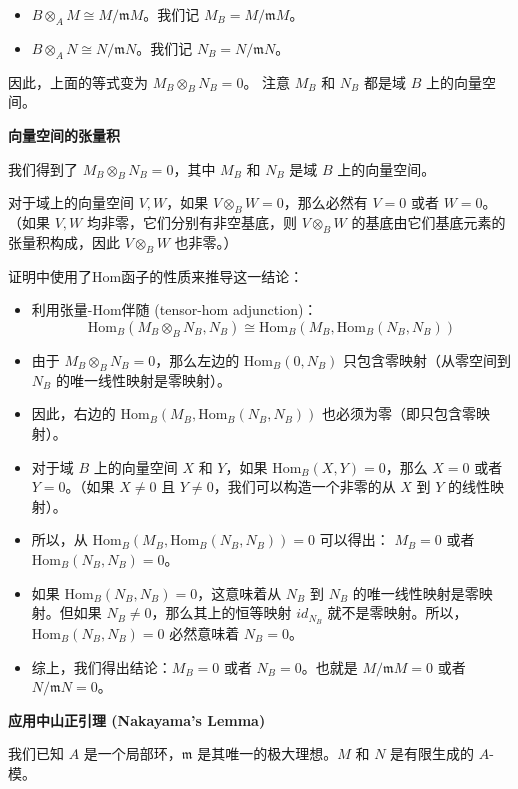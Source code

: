 \begin{itemize}
	\item $B \otimes_A M \cong M/\mathfrak{m}M$。我们记 $M_B = M/\mathfrak{m}M$。
	\item $B \otimes_A N \cong N/\mathfrak{m}N$。我们记 $N_B = N/\mathfrak{m}N$。
\end{itemize}

因此，上面的等式变为 $M_B \otimes_B N_B = 0$。 注意 $M_B$ 和 $N_B$ 都是域 $B$ 上的向量空间。

\textbf{向量空间的张量积}

我们得到了 $M_B \otimes_B N_B = 0$，其中 $M_B$ 和 $N_B$ 是域 $B$ 上的向量空间。

对于域上的向量空间 $V, W$，如果 $V \otimes_B W = 0$，那么必然有 $V=0$ 或者 $W=0$。（如果 $V, W$ 均非零，它们分别有非空基底，则 $V \otimes_B W$ 的基底由它们基底元素的张量积构成，因此 $V \otimes_B W$ 也非零。）

证明中使用了Hom函子的性质来推导这一结论：

\begin{itemize}
	\item 利用张量-Hom伴随 (tensor-hom adjunction)：
\[
\text{Hom}_B(M_B \otimes_B N_B, N_B) \cong \text{Hom}_B(M_B, \text{Hom}_B(N_B, N_B))
\]	\item 由于 $M_B \otimes_B N_B = 0$，那么左边的 $\text{Hom}_B(0, N_B)$ 只包含零映射（从零空间到 $N_B$ 的唯一线性映射是零映射）。
	\item 因此，右边的 $\text{Hom}_B(M_B, \text{Hom}_B(N_B, N_B))$ 也必须为零（即只包含零映射）。
	\item 对于域 $B$ 上的向量空间 $X$ 和 $Y$，如果 $\text{Hom}_B(X, Y) = 0$，那么 $X=0$ 或者 $Y=0$。（如果 $X \ne 0$ 且 $Y \ne 0$，我们可以构造一个非零的从 $X$ 到 $Y$ 的线性映射）。
	\item 所以，从 $\text{Hom}_B(M_B, \text{Hom}_B(N_B, N_B)) = 0$ 可以得出：
$M_B = 0$ 或者 $\text{Hom}_B(N_B, N_B) = 0$。
	\item 如果 $\text{Hom}_B(N_B, N_B) = 0$，这意味着从 $N_B$ 到 $N_B$ 的唯一线性映射是零映射。但如果 $N_B \ne 0$，那么其上的恒等映射 $id_{N_B}$ 就不是零映射。所以，$\text{Hom}_B(N_B, N_B) = 0$ 必然意味着 $N_B = 0$。
	\item 综上，我们得出结论：$M_B = 0$ 或者 $N_B = 0$。也就是 $M/\mathfrak{m}M = 0$ 或者 $N/\mathfrak{m}N = 0$。
\end{itemize}

\textbf{应用中山正引理 (Nakayama's Lemma)}

我们已知 $A$ 是一个局部环，$\mathfrak{m}$ 是其唯一的极大理想。$M$ 和 $N$ 是有限生成的 $A$-模。

